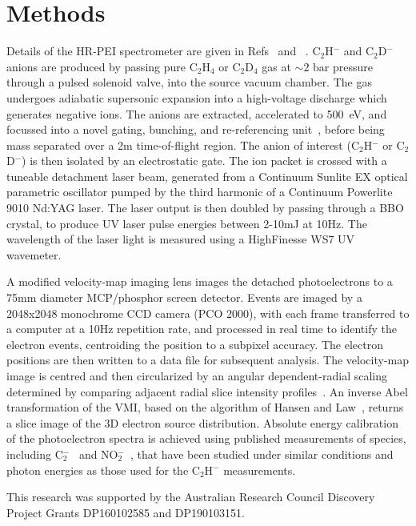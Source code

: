 \documentclass[journal=jpcafh,manuscript=article,layout=onecolumn, 12pt]{achemso}
\newcommand{\onlinecite}[1]{\hspace{-1 ex} \nocite{#1}\citenum{#1}}
\begin{document}
\section{Methods}
Details of the HR-PEI spectrometer are given in Refs~\onlinecite{cav07} and~\onlinecite{dev17}. C$_2$H$^-$ and C$_2$D$^-$ anions are produced by passing pure C$_2$H$_4$ or C$_2$D$_4$ gas at $\sim2$ bar pressure through a pulsed solenoid valve, into the source vacuum chamber. The gas undergoes adiabatic supersonic expansion into a high-voltage discharge which generates negative ions. The anions are extracted, accelerated to 500~eV, and focussed into a novel gating, bunching, and re-referencing unit~\cite{ded01}, before being mass separated over a 2m time-of-flight region. The anion of interest (C$_2$H$^-$ or C$_2$D$^-$) is then isolated by an electrostatic gate. The ion packet is crossed with a tuneable detachment laser beam, generated from a Continuum Sunlite EX optical parametric oscillator pumped by the third harmonic of a Continuum Powerlite 9010 Nd:YAG laser. The laser output is then doubled by passing through a BBO crystal, to produce UV laser pulse energies between 2-10mJ at 10Hz. The wavelength of the laser light is measured using a HighFinesse WS7 UV wavemeter.

A modified velocity-map imaging lens images the detached photoelectrons to a 75mm diameter MCP/phosphor screen detector. Events are imaged by a 2048x2048 monochrome CCD camera (PCO 2000), with each frame transferred to a computer at a 10Hz repetition rate, and processed in real time to identify the electron events, centroiding the position to
a subpixel accuracy. The electron positions are then written to a data file for subsequent analysis. The velocity-map image is centred and then circularized by an angular dependent-radial scaling determined by comparing adjacent radial slice intensity profiles~\cite{gas17}. An inverse Abel transformation of the VMI, based on the algorithm of Hansen and Law~\cite{han85,hic19}, returns a slice image of the 3D electron source distribution. Absolute energy calibration of the photoelectron spectra is achieved using published measurements of species, including C$_2^-$~\cite{law19b} and NO$_2^-$~\cite{law19}, that have been studied under similar conditions and photon energies as those used for the C$_2$H$^-$ measurements.




\begin{acknowledgement}
	This research was supported by the Australian Research Council Discovery
	Project Grants DP160102585 and DP190103151.  
\end{acknowledgement}


\end{document}
